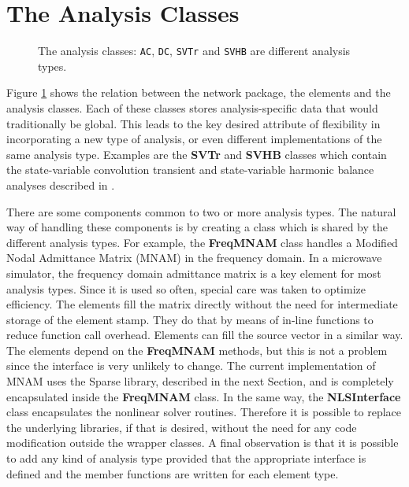 \section{The Analysis Classes}

%
\begin{figure}[htpb]
\centerline{\epsfxsize=13cm }
\caption{The analysis classes: {\tt AC}, {\tt DC}, {\tt SVTr} and {\tt SVHB} are
different analysis types.} \label{fig:analysis}
\end{figure}
%
Figure \ref{fig:analysis} shows the relation between the network
package, the elements and the analysis classes.  Each of these classes
stores analysis-specific data that would traditionally be global. This
leads to the key desired attribute of flexibility in incorporating a
new type of analysis, or even different implementations of the same
analysis type. Examples are the {\bf SVTr} and {\bf SVHB} classes
which contain the state-variable convolution transient and state-variable
harmonic balance analyses described in \cite{carlos_phd}.

There are some components common to two or more analysis types. The
natural way of handling these components is by creating a class which
is shared by the different analysis types. For example, the {\bf
FreqMNAM} class handles a Modified Nodal Admittance Matrix (MNAM) in
the frequency domain.  In a microwave simulator, the frequency domain
admittance matrix is a key element for most analysis types. Since it
is used so often, special care was taken to optimize efficiency.  The
elements fill the matrix directly without the need for intermediate
storage of the element stamp.  They do that by means of in-line
functions to reduce function call overhead. Elements can fill the
source vector in a similar way.  The elements depend on the {\bf
FreqMNAM} methods, but this is not a problem since the interface is
very unlikely to change.  The current implementation of MNAM uses the
Sparse library, described in the next Section, and is completely
encapsulated inside the {\bf FreqMNAM} class.  In the same way, the
{\bf NLSInterface} class encapsulates the nonlinear solver
routines. Therefore it is possible to replace the underlying
libraries, if that is desired, without the need for any code
modification outside the wrapper classes.  A final observation is that
it is possible to add any kind of analysis type provided that the
appropriate interface is defined and the member functions are written
for each element type.

